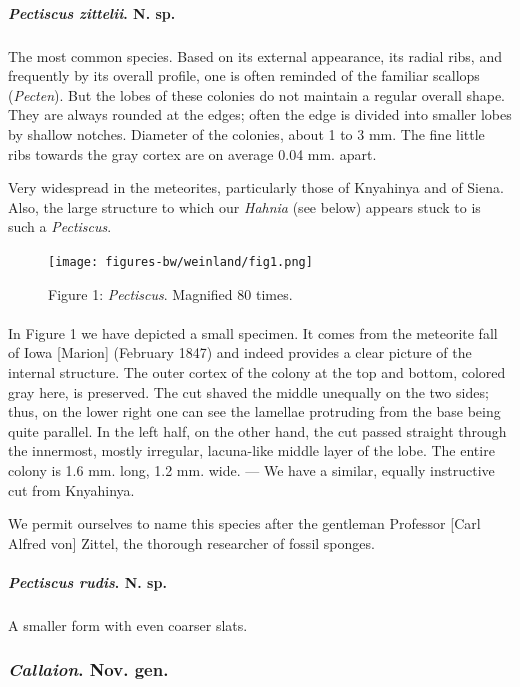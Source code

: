 \documentclass[a4paper, 12pt, oneside]{article}
\begin{document}
\paragraph{\emph{Pectiscus zittelii}. N. sp.}
\subparagraph{}
The most common species. Based on its external appearance, its radial ribs, and frequently by its overall profile, one is often reminded of the familiar scallops (\emph{Pecten}). But the lobes of these colonies do not maintain a regular overall shape. They are always rounded at the edges; often the edge is divided into smaller lobes by shallow notches. Diameter of the colonies, about 1 to 3 mm. The fine little ribs towards the gray cortex are on average 0.04 mm. apart.

Very widespread in the meteorites, particularly those of Knyahinya and of Siena. Also, the large structure to which our \emph{Hahnia} (see below) appears stuck to is such a \emph{Pectiscus}.
\begin{figure}[H]
\centering
\texttt{[image: figures-bw/weinland/fig1.png]}
\caption{Figure 1: \emph{Pectiscus}. Magnified 80 times.}
\end{figure}
\paragraph*{}
In Figure 1 we have depicted a small specimen. It comes from the meteorite fall of Iowa [Marion] (February 1847) and indeed provides a clear picture of the internal structure. The outer cortex of the colony at the top and bottom, colored gray here, is preserved. The cut shaved the middle unequally on the two sides; thus, on the lower right one can see the lamellae protruding from the base being quite parallel. In the left half, on the other hand, the cut passed straight through the innermost, mostly irregular, lacuna-like middle layer of the lobe. The entire colony is 1.6 mm. long, 1.2 mm. wide. --- We have a similar, equally instructive cut from Knyahinya.

We permit ourselves to name this species after the gentleman Professor [Carl Alfred von] Zittel, the thorough researcher of fossil sponges.
\paragraph{\emph{Pectiscus rudis}. N. sp.}
\subparagraph{}
A smaller form with even coarser slats.
\subsubsection{\emph{Callaion}. Nov. gen.}
\end{document}
